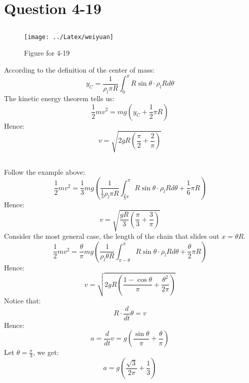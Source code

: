 \documentclass[12pt,a4paper]{article}%
\begin{document}
	\section{Question 4-19}
	\subsection{}
	\begin{figure}[H]
		\centering
		\texttt{[image: ../Latex/weiyuan]}
		\caption*{Figure for 4-19}
		\label{fig:weiyuan}
	\end{figure}
	\noindent According to the definition of the center of mass:
	\begin{equation}
		y_C=\frac{1}{\rho _l\pi R}\int_0^{\pi}{R\sin \theta \cdot \rho _lRd\theta}
	\end{equation}
	The kinetic energy theorem tells us:
	\begin{equation}
		\frac{1}{2}mv^2=mg(y_C+\frac{1}{2}\pi R)
	\end{equation}
	Hence:
	\begin{equation*}
		v=\sqrt{2gR(\frac{\pi}{2}+\frac{2}{\pi})}
	\end{equation*}
	\subsection{}
	\noindent Follow the example above:
	\begin{equation}
		\frac{1}{2}mv^2=\frac{1}{3}mg\left( \frac{1}{\frac{1}{3}\rho _l\pi R}\int_{\frac{2}{3}\pi}^{\pi}{R\sin \theta \cdot \rho _lRd\theta +\frac{1}{6}\pi R} \right) 
	\end{equation}
	Hence:
	\begin{equation*}
		v=\sqrt{\frac{gR}{3}(\frac{\pi}{3}+\frac{3}{\pi})}
	\end{equation*}
	Consider the most general case, the length of the chain that slides out $x=\theta R$.
	\begin{equation}
		\frac{1}{2}mv^2=\frac{\theta}{\pi}mg\left( \frac{1}{\rho _l\theta R}\int_{\pi -\theta}^{\pi}{R\sin \theta \cdot \rho _lRd\theta +\frac{\theta}{2}\pi R} \right) 
	\end{equation}
	Hence:
	\begin{equation}
		v=\sqrt{2gR\left( \frac{1-\cos \theta}{\pi}+\frac{\theta ^2}{2\pi} \right)}
	\end{equation}
	Notice that:
	\begin{equation}
		R\cdot\frac{d}{dt}\theta=v
	\end{equation}
	Hence:
	\begin{equation}
		a=\frac{d}{dt}v=g\left( \frac{\sin \theta}{\pi}+\frac{\theta}{\pi} \right)
	\end{equation}
	Let $\theta=\frac{\pi}{3}$, we get:
	\begin{equation*}
		a=g\left( \frac{\sqrt{3}}{2\pi}+\frac{1}{3} \right)
	\end{equation*}
	\newpage
\end{document}
